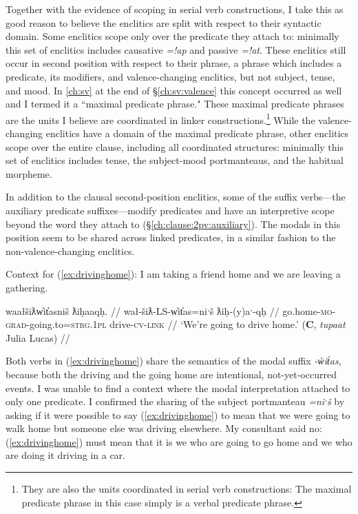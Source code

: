 Together with the evidence of scoping in serial verb constructions, I take this as good reason to believe the enclitics are split with respect to their syntactic domain. Some enclitics scope only over the predicate they attach to: minimally this set of enclitics includes causative \textit{=!ap} and passive \textit{=!at}. These enclitics still occur in second position with respect to their phrase, a phrase which includes a predicate, its modifiers, and valence-changing enclitics, but not subject, tense, and mood. In \cref{ch:sv} at the end of \S\ref{ch:sv:valence} this concept occurred as well and I termed it a ``maximal predicate phrase." These maximal predicate phrases are the units I believe are coordinated in linker constructions.\footnote{They are also the units coordinated in serial verb constructions: The maximal predicate phrase in this case simply is a verbal predicate phrase.} While the valence-changing enclitics have a domain of the maximal predicate phrase, other enclitics scope over the entire clause, including all coordinated structures: minimally this set of enclitics includes tense, the subject-mood portmanteaus, and the habitual morpheme.

In addition to the clausal second-position enclitics, some of the suffix verbs---the auxiliary predicate suffixes---modify predicates and have an interpretive scope beyond the word they attach to (\S\ref{ch:clause:2pv:auxiliary}). The modals in this position seem to be shared across linked predicates, in a similar fashion to the non-valence-changing enclitics.

\vspace{5pt}

\noindent Context for (\ref{ex:drivinghome}): I am taking a friend home and we are leaving a gathering.

\ex \label{ex:drivinghome}
\begingl
\glpreamble waałšiƛw̓it̓asniš ƛiḥaaqḥ. //
\gla wał-šiƛ-LS-w̓it̓as=niˑš ƛiḥ-(y)aˑ-qḥ //
\glb go.home-\textsc{mo}-\textsc{grad}-going.to=\textsc{strg.1pl} drive-\textsc{cv}-\textsc{link} //
\glft `We're going to drive home.' (\textbf{C}, \textit{tupaat} Julia Lucas) //
\endgl
\xe

Both verbs in (\ref{ex:drivinghome}) share the semantics of the modal suffix \textit{-w̓it̓as}, because both the driving and the going home are intentional, not-yet-occurred events. I was unable to find a context where the modal interpretation attached to only one predicate. I confirmed the sharing of the subject portmanteau \textit{=niˑš} by asking if it were possible to say (\ref{ex:drivinghome}) to mean that we were going to walk home but someone else was driving elsewhere. My consultant said no: (\ref{ex:drivinghome}) must mean that it is we who are going to go home and we who are doing it driving in a car.

